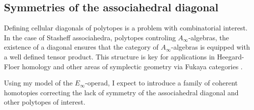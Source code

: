 \subsection{Symmetries of the associahedral diagonal}

Defining cellular diagonals of polytopes is a problem with combinatorial interest.
In the case of Stasheff associahedra, polytopes controling $A_\infty$-algebras,
the existence of a diagonal ensures that the category of $A_\infty$-algebras is equipped with a well defined tensor product.
This structure is key for applications in Heegard-Floer homology and other areas of symplectic geometry via Fukaya categories \cite{lipshitz2020diagonals}.

Using my model of the $E_\infty$-operad, I expect to introduce a family of coherent homotopies correcting the lack of symmetry of the associahedral diagonal and other polytopes of interest.
